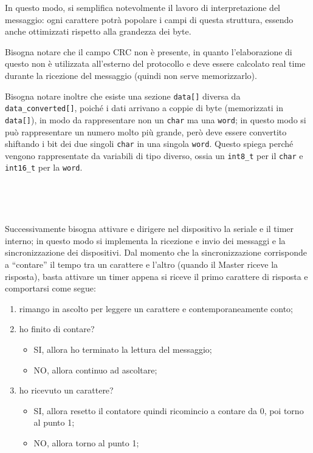 \documentclass[a4paper,titlepage]{book}
\begin{document}
In questo modo, si semplifica notevolmente il lavoro di interpretazione del messaggio: ogni carattere potrà popolare i campi di questa struttura, essendo anche ottimizzati rispetto alla grandezza dei byte. 

Bisogna notare che il campo CRC non è presente, in quanto l'elaborazione di questo non è utilizzata all'esterno del protocollo e deve essere calcolato real time durante la ricezione del messaggio (quindi non serve memorizzarlo).

Bisogna notare inoltre che esiste una sezione \lstinline!data[]! diversa da \lstinline!data_converted[]!, poiché i dati arrivano a coppie di byte (memorizzati in \lstinline!data[]!), in modo da rappresentare non un \lstinline!char! ma una \lstinline!word!; in questo modo si può rappresentare un numero molto più grande, però deve essere convertito shiftando i bit dei due singoli \lstinline!char! in una singola \lstinline!word!. Questo spiega perché vengono rappresentate da variabili di tipo diverso, ossia un \lstinline!int8_t! per il \lstinline!char! e \lstinline!int16_t! per la \lstinline!word!.

~

~

Successivamente bisogna attivare e dirigere nel dispositivo la seriale e il timer interno; in questo modo si implementa la ricezione e invio dei messaggi e la sincronizzazione dei dispositivi. Dal momento che la sincronizzazione corrisponde a ``contare'' il tempo tra un carattere e l'altro (quando il Master riceve la risposta), basta attivare un timer appena si riceve il primo carattere di risposta e comportarsi come segue:

\begin{enumerate}[noitemsep,topsep=15pt,parsep=6pt,partopsep=0pt]

\item rimango in ascolto per leggere un carattere e contemporaneamente conto;
\item ho finito di contare?
	\begin{itemize}
	\item SI, allora ho terminato la lettura del messaggio;
	\item NO, allora continuo ad ascoltare;
	\end{itemize}
\item ho ricevuto un carattere?
	\begin{itemize}
	\item SI, allora resetto il contatore quindi ricomincio a contare da 0, poi torno al punto 1;
	\item NO, allora torno al punto 1;
	\end{itemize}

\end{enumerate}
\end{document}
